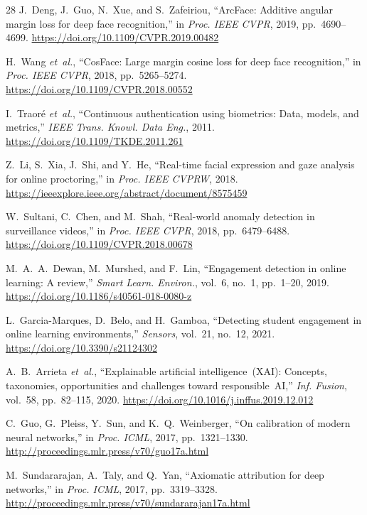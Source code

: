 \documentclass[journal]{IEEEtran}
\begin{document}
\begin{thebibliography}{28}
J.~Deng, J.~Guo, N.~Xue, and S.~Zafeiriou, ``ArcFace: Additive angular margin loss for deep face recognition,'' in \emph{Proc. IEEE CVPR}, 2019, pp.~4690--4699. \url{https://doi.org/10.1109/CVPR.2019.00482}

H.~Wang \emph{et~al.}, ``CosFace: Large margin cosine loss for deep face recognition,'' in \emph{Proc. IEEE CVPR}, 2018, pp.~5265--5274. \url{https://doi.org/10.1109/CVPR.2018.00552}

I.~Traor\'{e} \emph{et~al.}, ``Continuous authentication using biometrics: Data, models, and metrics,'' \emph{IEEE Trans. Knowl. Data Eng.}, 2011. \url{https://doi.org/10.1109/TKDE.2011.261}

Z.~Li, S.~Xia, J.~Shi, and Y.~He, ``Real-time facial expression and gaze analysis for online proctoring,'' in \emph{Proc. IEEE CVPRW}, 2018. \url{https://ieeexplore.ieee.org/abstract/document/8575459}

W.~Sultani, C.~Chen, and M.~Shah, ``Real-world anomaly detection in surveillance videos,'' in \emph{Proc. IEEE CVPR}, 2018, pp.~6479--6488. \url{https://doi.org/10.1109/CVPR.2018.00678}

M.~A.~A.~Dewan, M.~Murshed, and F.~Lin, ``Engagement detection in online learning: A review,'' \emph{Smart Learn. Environ.}, vol.~6, no.~1, pp.~1--20, 2019. \url{https://doi.org/10.1186/s40561-018-0080-z}

L.~Garcia-Marques, D.~Belo, and H.~Gamboa, ``Detecting student engagement in online learning environments,'' \emph{Sensors}, vol.~21, no.~12, 2021. \url{https://doi.org/10.3390/s21124302}

A.~B.~Arrieta \emph{et~al.}, ``Explainable artificial intelligence~(XAI): Concepts, taxonomies, opportunities and challenges toward responsible~AI,'' \emph{Inf. Fusion}, vol.~58, pp.~82--115, 2020. \url{https://doi.org/10.1016/j.inffus.2019.12.012}

C.~Guo, G.~Pleiss, Y.~Sun, and K.~Q.~Weinberger, ``On calibration of modern neural networks,'' in \emph{Proc. ICML}, 2017, pp.~1321--1330. \url{http://proceedings.mlr.press/v70/guo17a.html}

M.~Sundararajan, A.~Taly, and Q.~Yan, ``Axiomatic attribution for deep networks,'' in \emph{Proc. ICML}, 2017, pp.~3319--3328. \url{http://proceedings.mlr.press/v70/sundararajan17a.html}


\end{thebibliography}
\end{document}
